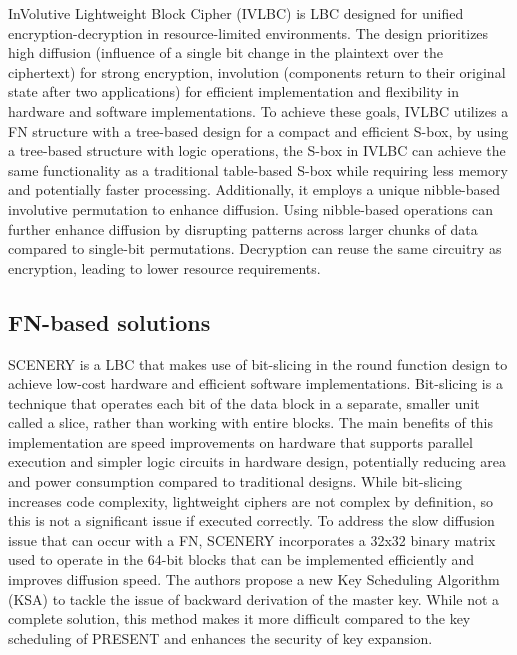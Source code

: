 \documentclass[conference]{IEEEtran}
\begin{document}
InVolutive Lightweight Block Cipher (IVLBC) is LBC designed for unified encryption-decryption in resource-limited environments. The design prioritizes high diffusion (influence of a single bit change in the plaintext over the ciphertext) for strong encryption, involution (components return to their original state after two applications) for efficient implementation and flexibility in hardware and software implementations. To achieve these goals, IVLBC utilizes a FN structure with a tree-based design for a compact and efficient S-box, by using a tree-based structure with logic operations, the S-box in IVLBC can achieve the same functionality as a traditional table-based S-box while requiring less memory and potentially faster processing. Additionally, it employs a unique nibble-based involutive permutation to enhance diffusion. Using nibble-based operations can further enhance diffusion by disrupting patterns across larger chunks of data compared to single-bit permutations. Decryption can reuse the same circuitry as encryption, leading to lower resource requirements\cite{IVLBC}.

\subsection{FN-based solutions}

SCENERY is a LBC that makes use of bit-slicing in the round function design to achieve low-cost hardware and efficient software implementations. Bit-slicing is a technique that operates each bit of the data block in a separate, smaller unit called a slice, rather than working with entire blocks. The main benefits of this implementation are speed improvements on hardware that supports parallel execution and simpler logic circuits in hardware design, potentially reducing area and power consumption compared to traditional designs. While bit-slicing increases code complexity, lightweight ciphers are not complex by definition, so this is not a significant issue if executed correctly. To address the slow diffusion issue that can occur with a FN, SCENERY incorporates a 32x32 binary matrix used to operate in the 64-bit blocks that can be implemented efficiently and improves diffusion speed. The authors propose a new Key Scheduling Algorithm (KSA) to tackle the issue of backward derivation of the master key. While not a complete solution, this method makes it more difficult compared to the key scheduling of PRESENT\cite{PRESENT} and enhances the security of key expansion.\cite{SCENERY}
\end{document}
